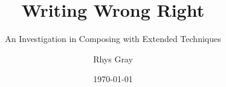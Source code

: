 \documentclass[draft]{turabian-thesis}
\title{Writing Wrong Right}
\subtitle{An Investigation in Composing with Extended Techniques}
\author{Rhys Gray}
\date{\today}
\begin{document}
\frontmatter{}
\maketitle
\tableofcontents{}

\mainmatter{}



% 

% 








% 

\backmatter{}

\begin{appendixes}
\end{appendixes}

\printbibliography{}
\end{document}
